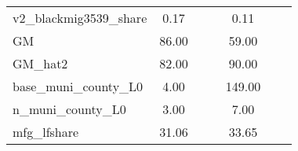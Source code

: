 \begin{table}[htbp]
\begin{tabular}{l*{2}{ccc}}
v2\_blackmig3539\_share&        0.17&            &            &        0.11&            &            \\
GM                  &       86.00&            &            &       59.00&            &            \\
GM\_hat2             &       82.00&            &            &       90.00&            &            \\
base\_muni\_county\_L0 &        4.00&            &            &      149.00&            &            \\
n\_muni\_county\_L0    &        3.00&            &            &        7.00&            &            \\
mfg\_lfshare         &       31.06&            &            &       33.65&            &            \\
\bottomrule
\end{tabular}
\end{table}
